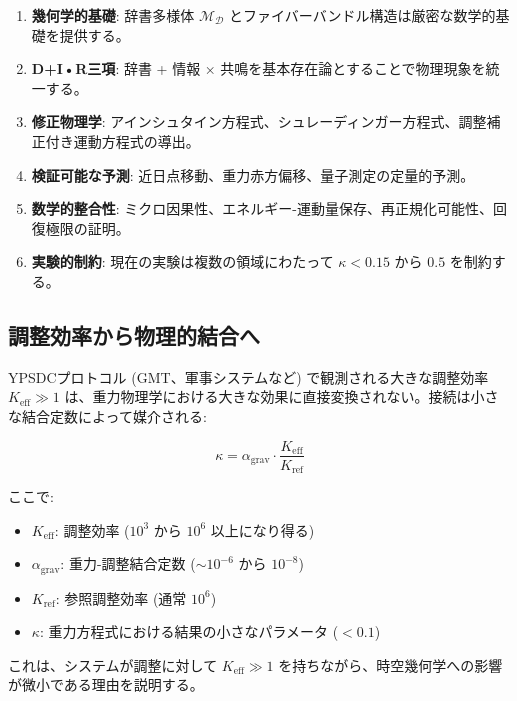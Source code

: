 \documentclass[11pt,a4paper]{article}
\begin{document}
	\begin{enumerate}
		\item \textbf{幾何学的基礎}: 辞書多様体 $\mathcal{M}_{\mathcal{D}}$ とファイバーバンドル構造は厳密な数学的基礎を提供する。
		
		\item \textbf{D+I•R三項}: 辞書 + 情報 × 共鳴を基本存在論とすることで物理現象を統一する。
		
		\item \textbf{修正物理学}: アインシュタイン方程式、シュレーディンガー方程式、調整補正付き運動方程式の導出。
		
		\item \textbf{検証可能な予測}: 近日点移動、重力赤方偏移、量子測定の定量的予測。
		
		\item \textbf{数学的整合性}: ミクロ因果性、エネルギー-運動量保存、再正規化可能性、回復極限の証明。
		
		\item \textbf{実験的制約}: 現在の実験は複数の領域にわたって $\kappa < 0.15$ から $0.5$ を制約する。
	\end{enumerate}
	
	\subsection{調整効率から物理的結合へ}
	\label{subsec:keff-to-coupling}
	
	YPSDCプロトコル (GMT、軍事システムなど) で観測される大きな調整効率 $K_{\mathrm{eff}} \gg 1$ は、重力物理学における大きな効果に直接変換されない。接続は小さな結合定数によって媒介される:
	
	\begin{equation}
		\kappa = \alpha_{\text{grav}} \cdot \frac{K_{\mathrm{eff}}}{K_{\text{ref}}}
	\end{equation}
	
	ここで:
	\begin{itemize}
		\item $K_{\mathrm{eff}}$: 調整効率 ($10^3$ から $10^6$ 以上になり得る)
		\item $\alpha_{\text{grav}}$: 重力-調整結合定数 ($\sim 10^{-6}$ から $10^{-8}$)
		\item $K_{\text{ref}}$: 参照調整効率 (通常 $10^6$)
		\item $\kappa$: 重力方程式における結果の小さなパラメータ ($< 0.1$)
	\end{itemize}
	
	これは、システムが調整に対して $K_{\mathrm{eff}} \gg 1$ を持ちながら、時空幾何学への影響が微小である理由を説明する。
	
\end{document}

